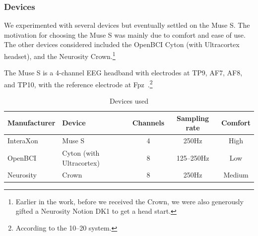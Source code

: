         \subsubsection{Devices}

            We experimented with several devices but eventually settled on the Muse S. The motivation for choosing the Muse S was mainly due to comfort and ease of use. The other devices considered included the OpenBCI Cyton (with Ultracortex headset), and the Neurosity Crown.\footnote{Earlier in the work, before we received the Crown, we were also generously gifted a Neurosity Notion DK1 to get a head start.}

            The Muse S is a 4-channel EEG headband with electrodes at TP9, AF7, AF8, and TP10, with the reference electrode at Fpz~\cite{krigolson_choosing_2017}.\footnote{According to the 10--20 system.}


            \begin{table}
                \centering
                \begin{tabular}{llccc}
                    \toprule
                    Manufacturer
                    & Device
                    & Channels
                    & Sampling rate
                    & Comfort
                    \\ 
                    \midrule
                    InteraXon
                    & Muse S
                    & 4
                    & 250Hz
                    & High \\
                 OpenBCI
                    & Cyton (with Ultracortex)
                    & 8
                    & 125--250Hz
                    & Low \\
                  Neurosity
                    & Crown
                    & 8
                    & 250Hz
                    & Medium \\
                    \bottomrule
                \end{tabular}
                \caption{Devices used}\label{table:devices}
            \end{table}


